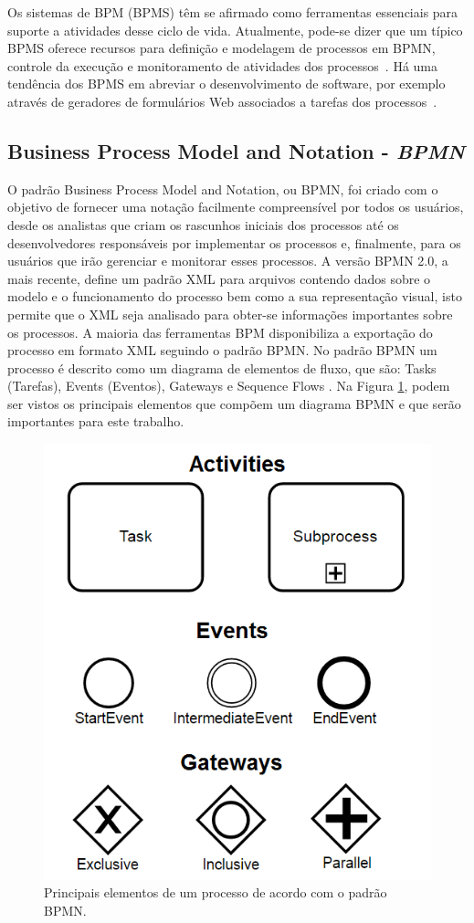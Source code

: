 \documentclass[12pt]{article}
\begin{document}
Os sistemas de BPM (BPMS) têm se afirmado como ferramentas essenciais para suporte a atividades desse ciclo de vida. Atualmente, pode-se dizer que um típico BPMS oferece recursos para definição e modelagem de processos em BPMN, controle da execução e monitoramento de atividades dos processos~\cite{forrester}. Há uma tendência dos BPMS em abreviar o desenvolvimento de software, por exemplo através de geradores de formulários Web associados a tarefas dos processos~\cite{greenresearch}. 

\subsection{Business Process Model and Notation - \emph{BPMN}}
O padrão Business Process Model and Notation, ou BPMN, foi criado com o objetivo de fornecer uma notação facilmente compreensível por todos os usuários, desde os analistas que criam os rascunhos iniciais dos processos até os desenvolvedores responsáveis por implementar os processos e, finalmente, para os usuários que irão gerenciar e monitorar esses processos\cite{model2011notation}. A versão BPMN 2.0, a mais recente, define um padrão XML para arquivos contendo dados sobre o modelo e o funcionamento do processo bem como a sua representação visual\cite{kurzdiagram}, isto permite que o XML seja analisado para obter-se informações importantes sobre os processos. A maioria das ferramentas BPM disponibiliza a exportação do processo em formato XML seguindo o padrão BPMN. No padrão BPMN um processo é descrito como um diagrama de elementos de fluxo, que são: Tasks (Tarefas), Events (Eventos), Gateways e Sequence Flows \cite{kurzdiagram}. Na Figura \ref{fig:bpmn}, podem ser vistos os principais elementos que compõem um diagrama BPMN e que serão importantes para este trabalho.

\begin{figure}[ht]
\centering
\includegraphics[width=.8\textwidth]{figuras/bpmn.png}
\caption{Principais elementos de um processo de acordo com o padrão BPMN.}
\label{fig:bpmn}
\end{figure}
\end{document}
